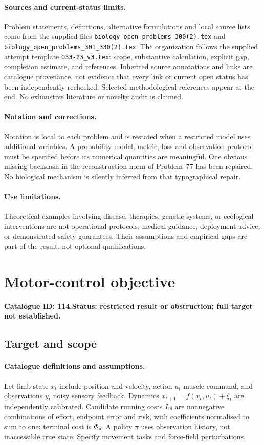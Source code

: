 \documentclass[11pt]{article}
\begin{document}
\paragraph{Sources and current-status limits.}
Problem statements, definitions, alternative formulations and local source lists
come from the supplied files
\texttt{biology\_open\_problems\_300(2).tex} and
\texttt{biology\_open\_problems\_301\_330(2).tex}.
The organization follows the supplied attempt template
\texttt{O33-23\_v3.tex}: scope, substantive calculation, explicit gap,
completion estimate, and references. Inherited source annotations and links are
catalogue provenance, not evidence that every link or current open status has
been independently rechecked. Selected methodological references appear at the
end. No exhaustive literature or novelty audit is claimed.

\paragraph{Notation and corrections.}
Notation is local to each problem and is restated when a restricted model uses
additional variables. A probability model, metric, loss and observation protocol
must be specified before its numerical quantities are meaningful. One obvious
missing backslash in the reconstruction norm of Problem~77 has been repaired.
No biological mechanism is silently inferred from that typographical repair.

\paragraph{Use limitations.}
Theoretical examples involving disease, therapies, genetic systems, or ecological
interventions are not operational protocols, medical guidance, deployment advice,
or demonstrated safety guarantees. Their assumptions and empirical gaps are part
of the result, not optional qualifications.

\setcounter{section}{113}
\section{Motor-control objective}
\label{prob:114}
\noindent\textbf{Catalogue ID: 114.}\quad \textbf{Status: restricted result or obstruction; full target not established.}
\subsection{Target and scope}
\paragraph{Catalogue definitions and assumptions.}
Let limb state $x_t$ include position and velocity, action $u_t$ muscle command, and observations $y_t$ noisy sensory feedback. Dynamics $x_{t+1}=f(x_t,u_t)+\xi_t$ are independently calibrated. Candidate running costs $L_\theta$ are nonnegative combinations of effort, endpoint error and risk, with coefficients normalised to sum to one; terminal cost is $\Phi_\theta$. A policy $\pi$ uses observation history, not inaccessible true state. Specify movement tasks and force-field perturbations.
\end{document}
